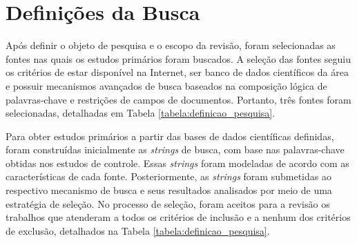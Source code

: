 \section{Definições da Busca}

Após definir o objeto de pesquisa e o escopo da revisão, foram selecionadas as fontes nas quais os estudos primários foram buscados. A seleção das fontes seguiu os critérios de estar disponível na Internet, ser banco de dados científicos da área e possuir mecanismos avançados de busca baseados na composição lógica de palavras-chave e restrições de campos de documentos. Portanto, três fontes foram selecionadas, detalhadas em Tabela \ref{tabela:definicao_pesquisa}.

Para obter estudos primários a partir das bases de dados científicas definidas, foram construídas inicialmente as \textit{strings} de busca, com base nas palavras-chave obtidas nos estudos de controle. Essas \textit{strings} foram modeladas de acordo com as características de cada fonte. Posteriormente, as \textit{strings} foram submetidas ao respectivo mecanismo de busca e seus resultados analisados por meio de uma estratégia de seleção. No processo de seleção, foram aceitos para a revisão os trabalhos que atenderam a todos os critérios de inclusão e a nenhum dos critérios de exclusão, detalhados na Tabela \ref{tabela:definicao_pesquisa}.


